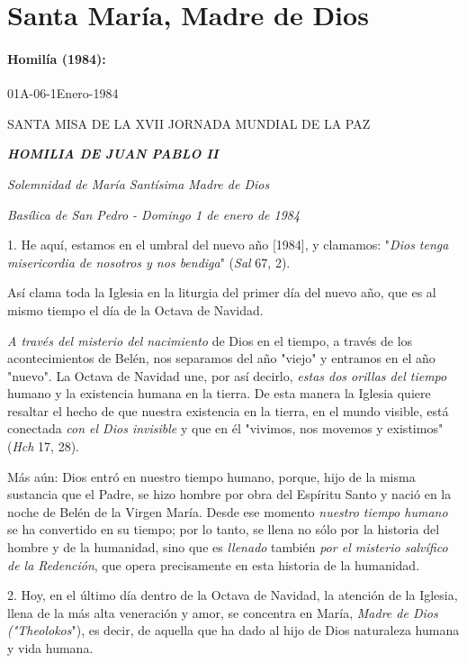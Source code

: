 \begin{body}
\begin{body}
\end{body} 

\chapter{Santa María, Madre de Dios}

\subsubsection{Homilía (1984): }
01A-06-1Enero-1984

SANTA MISA DE LA XVII JORNADA MUNDIAL DE LA PAZ

\emph{\textbf{HOMILIA DE JUAN PABLO II}}

\emph{Solemnidad de María Santísima Madre de Dios}

\emph{Basílica de San Pedro - Domingo 1 de enero de 1984}

1. He aquí, estamos en el umbral del nuevo año {[}1984{]}, y clamamos:
"\emph{Dios tenga misericordia de nosotros y nos bendiga}" (\emph{Sal}
67, 2).

Así clama toda la Iglesia en la liturgia del primer día del nuevo año,
que es al mismo tiempo el día de la Octava de Navidad.

\emph{A través del misterio del nacimiento} de Dios en el tiempo, a
través de los acontecimientos de Belén, nos separamos del año "viejo" y
entramos en el año "nuevo". La Octava de Navidad une, por así decirlo,
\emph{estas dos orillas del tiempo} humano y la existencia humana en la
tierra. De esta manera la Iglesia quiere resaltar el hecho de que
nuestra existencia en la tierra, en el mundo visible, está conectada
\emph{con el Dios invisible} y que en él "vivimos, nos movemos y
existimos" (\emph{Hch} 17, 28).

Más aún: Dios entró en nuestro tiempo humano, porque, hijo de la misma
sustancia que el Padre, se hizo hombre por obra del Espíritu Santo y
nació en la noche de Belén de la Virgen María. Desde ese momento
\emph{nuestro tiempo humano} se ha convertido en su tiempo; por lo
tanto, se llena no sólo por la historia del hombre y de la humanidad,
sino que es \emph{llenado} también \emph{por el misterio salvífico de la
	Redención}, que opera precisamente en esta historia de la humanidad.

2. Hoy, en el último día dentro de la Octava de Navidad, la atención de
la Iglesia, llena de la más alta veneración y amor, se concentra en
María, \emph{Madre de Dios ("Theolokos}"), es decir, de aquella que ha
dado al hijo de Dios naturaleza humana y vida humana.


\end{body}
